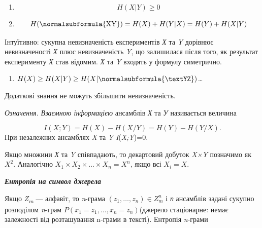 \liststyleWWviiiNumxxxix
\setcounter{saveenum}{\value{enumi}}
\begin{enumerate}
\setcounter{enumi}{\value{saveenum}}
\item \begin{equation*}
{H(X|Y)\ge 0}
\end{equation*}
\item \begin{equation*}
{H(\normalsubformula{\text{XY}})=H(X)+H(Y|X)=H(Y)+H(X|Y)}
\end{equation*}
\end{enumerate}
Інтуїтивно: сукупна невизначеність експериментів \textit{Х} та \textit{Y}
дорівнює невизначеності \textit{Х} плюс невизначеність \textit{Y}, що
залишилася після того, як результат експерименту \textit{Х} став відомим.
\textit{Х} та \textit{Y} входять у формулу симетрично.

\liststyleWWviiiNumxxxix
\setcounter{saveenum}{\value{enumi}}
\begin{enumerate}
\setcounter{enumi}{\value{saveenum}}
\item  $H(X)\ge H(X|Y)\ge H(X|\normalsubformula{\textYZ})$…
\end{enumerate}
Додаткові знання не можуть збільшити невизначеність.


\bigskip

\textit{Означення.}\textit{  Взаємною інформацією} ансамблів \textit{Х} та
\textit{У }називається величина 

\begin{equation*}
{I(X;Y)=H(X)-H(X/Y)=H(Y)-H(Y/X)\text{.}}
\end{equation*}
При незалежних ансамблях \textit{X} та \textit{Y} 
\textit{I}(\textit{X}\textit{;}\textit{Y})=0.


\bigskip

Якщо множини \textit{Х} та \textit{Y} співпадають, то декартовий добуток
\textit{X×Y} позначимо як  $X^2$. Аналогічно  ${X_{1}\times
X_{2}\times \dots\times X_{n}=X^{n}}$, якщо всі 
$X_i=X$.


\bigskip


\bigskip

{\centering\bfseries\itshape
Ентропія на символ джерела
\par}


\bigskip


\bigskip

Якщо \textit{Z}\textit{\textsubscript{m}} --- алфавіт, то \textit{n}{}-грама 
$(z_{1},\dots,z_{n})\in Z_{m}^n$ і \textit{п}
ансамблів задані сукупно розподілом \textit{n}{}-грам 
$P(x_{1}=z_{1},\dots,x_{n}=z_n)$(джерело
стаціонарне: немає залежності від розташування n-грами в тексті). Ентропія
\textit{n}{}-грами

